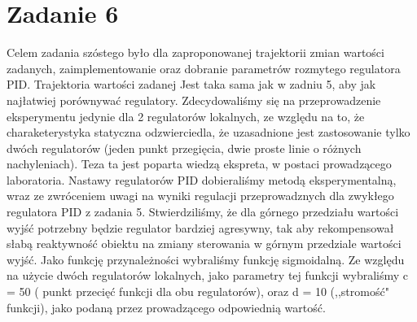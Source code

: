 \chapter{Zadanie 6}
Celem zadania szóstego było dla zaproponowanej trajektorii zmian wartości zadanych, zaimplementowanie
oraz dobranie parametrów rozmytego regulatora PID. Trajektoria wartości zadanej
Jest taka sama jak w zadniu 5, aby jak najłatwiej porównywać regulatory. Zdecydowaliśmy się na przeprowadzenie eksperymentu
jedynie dla 2 regulatorów lokalnych, ze względu na to, że charaketerystyka statyczna odzwierciedla, że
uzasadnione jest zastosowanie tylko dwóch regulatorów (jeden punkt przegięcia, dwie proste linie o różnych nachyleniach).
Teza ta jest poparta wiedzą ekspreta, w postaci prowadzącego laboratoria.
Nastawy regulatorów PID dobieraliśmy metodą eksperymentalną, wraz ze zwróceniem uwagi na wyniki
regulacji przeprowadznych dla zwykłego regulatora PID z zadania 5. Stwierdziliśmy, że
dla górnego przedziału wartości wyjść potrzebny będzie regulator bardziej agresywny, tak
aby rekompensował słabą reaktywność obiektu na zmiany sterowania w górnym przedziale wartości wyjść.
Jako funkcję przynależności wybraliśmy funkcję sigmoidalną. Ze względu na użycie dwóch
regulatorów lokalnych, jako parametry tej funkcji wybraliśmy c = 50 ( punkt przecięć funkcji dla obu regulatorów),
oraz d = 10 (,,stromość" funkcji), jako podaną przez prowadzącego odpowiednią wartość.

